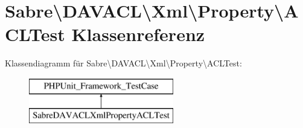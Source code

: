 \hypertarget{class_sabre_1_1_d_a_v_a_c_l_1_1_xml_1_1_property_1_1_a_c_l_test}{}\section{Sabre\textbackslash{}D\+A\+V\+A\+CL\textbackslash{}Xml\textbackslash{}Property\textbackslash{}A\+C\+L\+Test Klassenreferenz}
\label{class_sabre_1_1_d_a_v_a_c_l_1_1_xml_1_1_property_1_1_a_c_l_test}
Klassendiagramm für Sabre\textbackslash{}D\+A\+V\+A\+CL\textbackslash{}Xml\textbackslash{}Property\textbackslash{}A\+C\+L\+Test\+:\begin{figure}[H]
\begin{center}
\leavevmode
\includegraphics[height=2.000000cm]{class_sabre_1_1_d_a_v_a_c_l_1_1_xml_1_1_property_1_1_a_c_l_test}
\end{center}
\end{figure}
